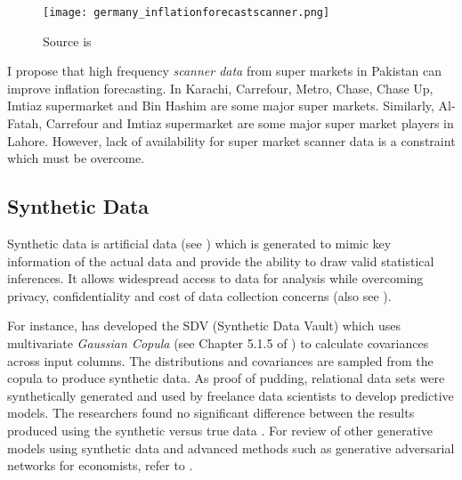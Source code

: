 \documentclass[12pt]{article}
\newcommand{\1}{\mathbbm 1}
\begin{document}
		
		
		
		\begin{figure}[H]
			\begin{Center}
				\texttt{[image: germany\_inflationforecastscanner.png]}
				\caption{Source is \cite{beck2022}}
			\end{Center}
		\end{figure}
		
		
		I propose that high frequency \textit{scanner data} from super markets in Pakistan can improve inflation forecasting. In Karachi, Carrefour, Metro, Chase, Chase Up, Imtiaz supermarket and Bin Hashim are some major super markets. Similarly, Al-Fatah, Carrefour and Imtiaz supermarket are some major super market players in Lahore. However, lack of availability for super market scanner data is a constraint which must be overcome.
		
		\subsection{Synthetic Data}
		
		
		Synthetic data is artificial data (see \cite{nikolenko2021synthetic}) which is generated to mimic key information of the actual data and provide the ability to draw valid statistical inferences. It allows widespread access to data for analysis while overcoming privacy, confidentiality and cost of data collection concerns (also see \cite{raghunathan2021synthetic}). 
		
		For instance, \cite{patki2016synthetic} has developed the SDV (Synthetic Data Vault) which uses multivariate \textit{Gaussian Copula} (see Chapter 5.1.5 of \cite{stachurski2016primer}) to calculate covariances across input columns. The distributions and covariances are sampled from the copula to produce synthetic data. As proof of pudding, relational data sets were synthetically generated and used by freelance data scientists to develop predictive models. The researchers found no significant difference between the results produced using the synthetic versus true data \cite{patki2016synthetic}. For review of other generative models using synthetic data and advanced methods such as generative adversarial networks for economists, refer to \cite{koenecke2020synthetic}.
		
\end{document}
